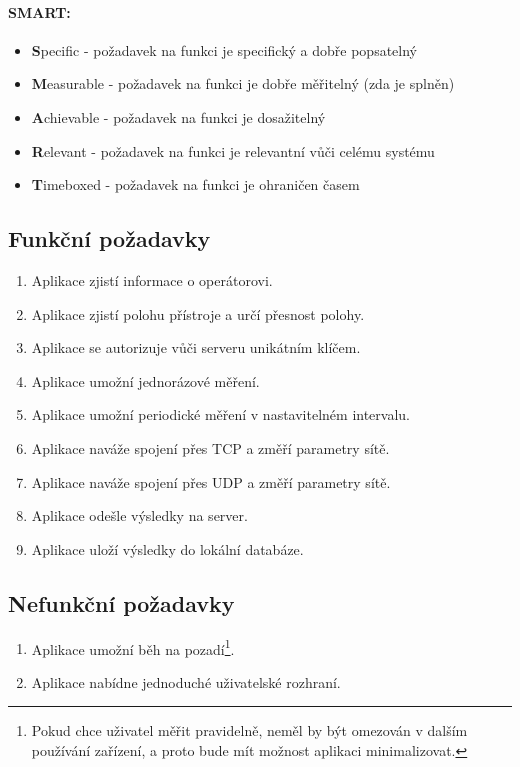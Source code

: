 \paragraph{SMART: }
\begin{itemize}
	\item{\bf S}pecific - požadavek na funkci je specifický a dobře popsatelný
	\item{\bf M}easurable - požadavek na funkci je dobře měřitelný (zda je splněn)
	\item{\bf A}chievable - požadavek na funkci je dosažitelný
	\item{\bf R}elevant - požadavek na funkci je relevantní vůči celému systému
	\item{\bf T}imeboxed - požadavek na funkci je ohraničen časem
\end{itemize}

\subsection{Funkční požadavky}
\begin{enumerate}
	\item Aplikace zjistí informace o operátorovi.
	\item Aplikace zjistí polohu přístroje a určí přesnost polohy.
	\item Aplikace se autorizuje vůči serveru unikátním klíčem.
	\item Aplikace umožní jednorázové měření.
	\item Aplikace umožní periodické měření v nastavitelném intervalu.
	\item Aplikace naváže spojení přes TCP a změří parametry sítě.
	\item Aplikace naváže spojení přes UDP a změří parametry sítě.
	\item Aplikace odešle výsledky na server.
	\item Aplikace uloží výsledky do lokální databáze.
\end{enumerate}
\subsection{Nefunkční požadavky}
\begin{enumerate}
	\item Aplikace umožní běh na pozadí\footnote{Pokud chce uživatel měřit pravidelně, neměl by být omezován v dalším používání zařízení, a proto bude mít možnost aplikaci minimalizovat.}.
	\item Aplikace nabídne jednoduché uživatelské rozhraní.
\end{enumerate}
\newpage

